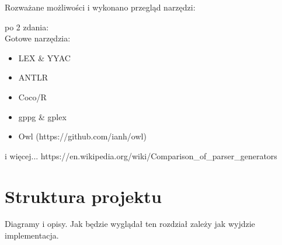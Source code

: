 Rozważane możliwości i wykonano przegląd narzędzi:

po 2 zdania: \\
Gotowe narzędzia:
\begin{itemize}
  \item LEX \& YYAC
  \item ANTLR
  \item Coco/R
  \item gppg \& gplex
  \item Owl (https://github.com/ianh/owl)
\end{itemize}
i więcej... https://en.wikipedia.org/wiki/Comparison\_of\_parser\_generators


\section{Struktura projektu}
Diagramy i opisy.
Jak będzie wyglądał ten rozdział zależy jak wyjdzie implementacja.
